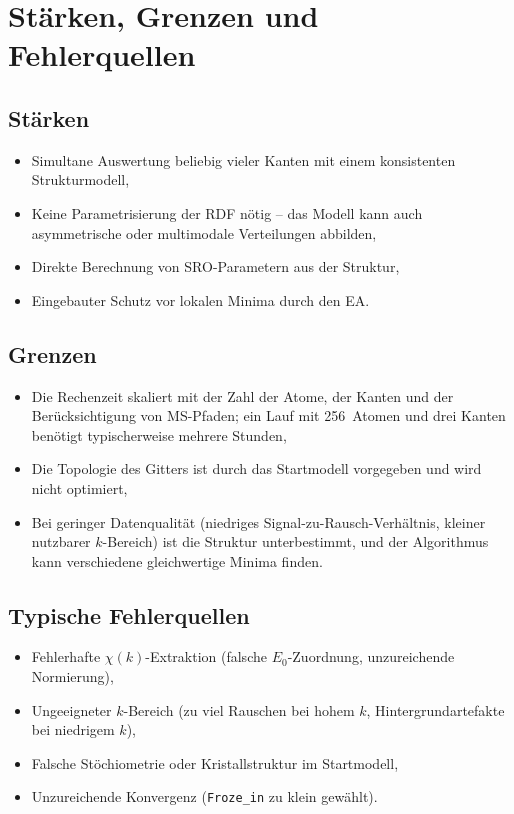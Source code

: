 

\section{Stärken, Grenzen und Fehlerquellen}

\subsection{Stärken}

\begin{itemize}[nosep]
  \item Simultane Auswertung beliebig vieler Kanten mit einem
        konsistenten Strukturmodell,
  \item Keine Parametrisierung der RDF nötig -- das Modell kann auch
        asymmetrische oder multimodale Verteilungen abbilden,
  \item Direkte Berechnung von SRO-Parametern aus der Struktur,
  \item Eingebauter Schutz vor lokalen Minima durch den EA.
\end{itemize}

\subsection{Grenzen}

\begin{itemize}[nosep]
  \item Die Rechenzeit skaliert mit der Zahl der Atome, der Kanten
        und der Berücksichtigung von MS-Pfaden; ein Lauf mit
        256~Atomen und drei Kanten benötigt typischerweise mehrere
        Stunden,
  \item Die Topologie des Gitters ist durch das Startmodell
        vorgegeben und wird nicht optimiert,
  \item Bei geringer Datenqualität (niedriges Signal-zu-Rausch-Verhältnis,
        kleiner nutzbarer $k$-Bereich) ist die Struktur
        unterbestimmt, und der Algorithmus kann verschiedene
        gleichwertige Minima finden.
\end{itemize}

\subsection{Typische Fehlerquellen}

\begin{itemize}[nosep]
  \item Fehlerhafte $\chi(k)$-Extraktion (falsche $E_0$-Zuordnung,
        unzureichende Normierung),
  \item Ungeeigneter $k$-Bereich (zu viel Rauschen bei hohem $k$,
        Hintergrundartefakte bei niedrigem $k$),
  \item Falsche Stöchiometrie oder Kristallstruktur im Startmodell,
  \item Unzureichende Konvergenz (\texttt{Froze\_in} zu klein gewählt).
\end{itemize}
